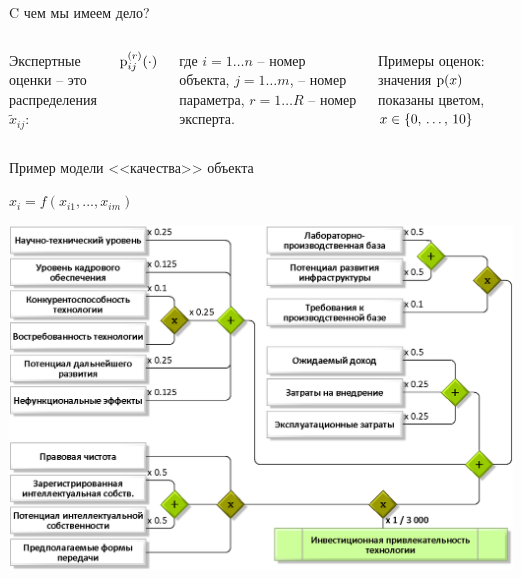 \begin{frame}{C чем мы имеем дело?}
	\vspace*{3mm}
	\begin{columns}
		Экспертные оценки -- это распределения $\tilde x_{ij}$: 
		{\large \begin{center} \hspace{-8mm}  ${\mathrm{p}}_{ij}^{(r)}( \cdot )$ \end{center} }
		{\footnotesize где $i = 1 \ldots n$ -- номер объекта, $j = 1 \ldots m$, -- номер параметра, $r = 1 \ldots R$ -- номер эксперта}.  
		\begin{center}
			\vspace*{-8mm}
			  {\scriptsize {Примеры оценок: значения ${\mathrm{p}}(x)$ показаны цветом, $x \in \{0,\, \ldots,\, 10\}$}}
			  \\ \vspace*{2mm}
		\end{center}
	\end{columns}
 \end{frame} %

\begin{frame}{Пример модели <<качества>> объекта}
     \begin{flushright}
       \vspace{-10mm} {\large $x_i = f(x_{i1}, ..., x_{im})$ }%
     \end{flushright}   
	\begin{center}
		\includegraphics[width=0.9\linewidth]{./pic/schemeF2}
	\end{center}
\end{frame} %


